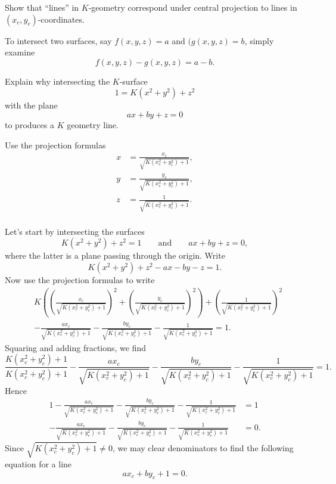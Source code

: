 \documentclass{ximera}
\begin{document}
\begin{problem}
Show that ``lines'' in $K$-geometry correspond under central
projection to lines in $(x_{c},y_{c})$-coordinates.

\begin{hint}
  To intersect two surfaces, say $f(x,y,z)=a$ and $(g(x,y,z)=b$,
  simply examine
  \[
  f(x,y,z)-g(x,y,z) = a-b.
  \]
\end{hint}

\begin{hint}
  Explain why intersecting the $K$-surface
  \[
  1 = K\left(x^2+y^2\right) + z^2 
  \]
  with the plane
  \[
  ax+by+z = 0
  \]
  to produces a $K$ geometry line.
\end{hint}

\begin{hint}
  Use the projection formulas
  \begin{align*}
      x &= \frac{x_c}{\sqrt{K\left(x_c^2 + y_c^2\right)+1}},\\
      y &= \frac{y_c}{\sqrt{K\left(x_c^2 + y_c^2\right)+1}},\\
      z &= \frac{1}{\sqrt{K\left(x_c^2 + y_c^2\right)+1}}.\\
  \end{align*}
\end{hint}

\begin{freeResponse}
  Let's start by intersecting the surfaces
  \[
  K\left(x^2+y^2\right)+z^2=1\qquad\text{and}\qquad ax+by+z=0,
  \]
  where the latter is a plane passing through the origin. Write
  \[
  K\left(x^2+y^2\right) + z^2- ax- by-z=1.
  \]
  Now use the projection formulas to write
  \begin{align*}
    &K\left(\left( \frac{x_c}{\sqrt{K\left(x_c^2 + y_c^2\right)+1}}\right)^2
    +\left(\frac{y_c}{\sqrt{K\left(x_c^2 + y_c^2\right)+1}}\right)^2\right)
    + \left(\frac{1}{\sqrt{K\left(x_c^2 + y_c^2\right)+1}}\right)^2\\
    &-\frac{ax_c}{\sqrt{K\left(x_c^2 + y_c^2\right)+1}}- \frac{by_c}{\sqrt{K\left(x_c^2 + y_c^2\right)+1}}-\frac{1}{\sqrt{K\left(x_c^2 + y_c^2\right)+1}}=1.
  \end{align*}
Squaring and adding fractions, we find
\[
\frac{K\left(x_c^2 + y_c^2\right)+1}{K\left(x_c^2 + y_c^2\right)+1}-\frac{ax_c}{\sqrt{K\left(x_c^2 + y_c^2\right)+1}}- \frac{by_c}{\sqrt{K\left(x_c^2 + y_c^2\right)+1}}-\frac{1}{\sqrt{K\left(x_c^2 + y_c^2\right)+1}}=1.
\]
Hence
\begin{align*}
1-\frac{ax_c}{\sqrt{K\left(x_c^2 + y_c^2\right)+1}}- \frac{by_c}{\sqrt{K\left(x_c^2 + y_c^2\right)+1}}-\frac{1}{\sqrt{K\left(x_c^2 + y_c^2\right)+1}} &=1\\
-\frac{ax_c}{\sqrt{K\left(x_c^2 + y_c^2\right)+1}}- \frac{by_c}{\sqrt{K\left(x_c^2 + y_c^2\right)+1}}-\frac{1}{\sqrt{K\left(x_c^2 + y_c^2\right)+1}} &=0.
\end{align*}
Since $\sqrt{K\left(x_c^2 + y_c^2\right)+1} \ne 0$, we may clear
  denominators to find the following equation for a line
  \[
  ax_c+by_c+1= 0.
  \]
\end{freeResponse}
\end{problem}
\end{document}
